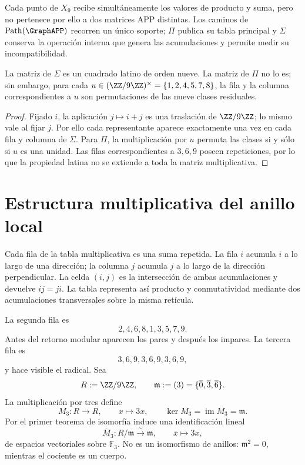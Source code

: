 Cada punto de \(X_9\) recibe simultáneamente los valores de producto y suma,
pero no pertenece por ello a dos matrices APP distintas. Los caminos de
\(\operatorname{Path}(\GraphAPP)\) recorren un único soporte; \(\Pi\)
publica su tabla principal y \(\Sigma\) conserva la operación interna que
genera las acumulaciones y permite medir su incompatibilidad.

\begin{proposition}
\label{prop:app-latina-unidades}
La matriz de \(\Sigma\) es un cuadrado latino de orden nueve. La matriz de
\(\Pi\) no lo es; sin embargo, para cada
\(u\in(\ZZ/9\ZZ)^\times=\{1,2,4,5,7,8\}\), la fila y la columna
correspondientes a \(u\) son permutaciones de las nueve clases residuales.
\end{proposition}

\begin{proof}
Fijado \(i\), la aplicación \(j\mapsto i+j\) es una traslación de
\(\ZZ/9\ZZ\); lo mismo vale al fijar \(j\). Por ello cada representante
aparece exactamente una vez en cada fila y columna de \(\Sigma\). Para
\(\Pi\), la multiplicación por \(u\) permuta las clases si y sólo si \(u\)
es una unidad. Las filas correspondientes a \(3,6,9\) poseen repeticiones,
por lo que la propiedad latina no se extiende a toda la matriz
multiplicativa.
\end{proof}

\section{Estructura multiplicativa del anillo local}

Cada fila de la tabla multiplicativa es una suma repetida. La fila \(i\)
acumula \(i\) a lo largo de una dirección; la columna \(j\) acumula \(j\) a
lo largo de la dirección perpendicular. La celda \((i,j)\) es la intersección
de ambas acumulaciones y devuelve \(ij=ji\). La tabla representa así producto
y conmutatividad mediante dos acumulaciones transversales sobre la misma
retícula.

La segunda fila es
\[
2,4,6,8,1,3,5,7,9.
\]
Antes del retorno modular aparecen los pares y después los impares. La tercera
fila es
\[
3,6,9,3,6,9,3,6,9,
\]
y hace visible el radical. Sea
\[
 R:=\ZZ/9\ZZ,
 \qquad
 \mathfrak m:=(3)=\{\overline0,\overline3,\overline6\}.
\]
La multiplicación por tres define
\[
 M_3:R\longrightarrow R,
 \qquad x\longmapsto3x,
 \qquad
 \ker M_3=\operatorname{im}M_3=\mathfrak m.
\]
Por el primer teorema de isomorfía induce una identificación lineal
\begin{equation}
 \overline M_3:R/\mathfrak m\xrightarrow{\ \sim\ }\mathfrak m,
 \qquad \overline x\longmapsto3x,
 \label{eq:multiplicador-tres-radical-rev3}
\end{equation}
de espacios vectoriales sobre \(\mathbb F_3\). No es un isomorfismo de
anillos: \(\mathfrak m^2=0\), mientras el cociente es un cuerpo.

